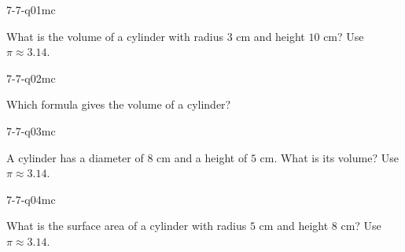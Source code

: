 

\begin{practiceQuestion}{7-7-q01}{mc}
\begin{questionText}
What is the volume of a cylinder with radius $3$ cm and height $10$ cm? Use $\pi \approx 3.14$.
\end{questionText}
\end{practiceQuestion}

\begin{practiceQuestion}{7-7-q02}{mc}
\begin{questionText}
Which formula gives the volume of a cylinder?
\end{questionText}
\end{practiceQuestion}

\begin{practiceQuestion}{7-7-q03}{mc}
\begin{questionText}
A cylinder has a diameter of $8$ cm and a height of $5$ cm. What is its volume? Use $\pi \approx 3.14$.
\end{questionText}
\end{practiceQuestion}

\begin{practiceQuestion}{7-7-q04}{mc}
\begin{questionText}
What is the surface area of a cylinder with radius $5$ cm and height $8$ cm? Use $\pi \approx 3.14$.
\end{questionText}
\end{practiceQuestion}


